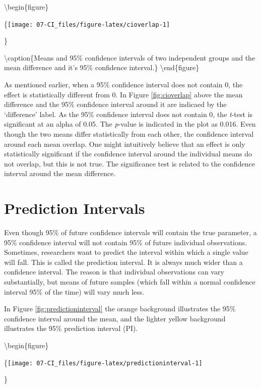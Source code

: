 \documentclass[
]{krantz}
\begin{document}
\textbackslash begin\{figure\}

\{\centering \texttt{[image: 07-CI\_files/figure-latex/cioverlap-1]}

\}

\textbackslash caption\{Means and 95\% confidence intervals of two independent groups and the mean difference and it's 95\% confidence interval.\}\label{fig:cioverlap}
\textbackslash end\{figure\}

As mentioned earlier, when a 95\% confidence interval does not contain 0, the effect is statistically different from 0. In Figure \ref{fig:cioverlap} above the mean difference and the 95\% confidence interval around it are indicaed by the `difference' label. As the 95\% confidence interval does not contain 0, the \emph{t}-test is significant at an alpha of 0.05. The \emph{p}-value is indicated in the plot as 0.016. Even though the two means differ statistically from each other, the confidence interval around each mean overlap. One might intuitively believe that an effect is only statistically significant if the confidence interval around the individual means do not overlap, but this is not true. The significance test is related to the confidence interval around the mean difference.

\hypertarget{prediction-intervals}{%
\section{Prediction Intervals}\label{prediction-intervals}}

Even though 95\% of future confidence intervals will contain the true parameter, a 95\% confidence interval will not contain 95\% of future individual observations. Sometimes, researchers want to predict the interval within which a single value will fall. This is called the prediction interval. It is always much wider than a confidence interval. The reason is that individual observations can vary substantially, but means of future samples (which fall within a normal confidence interval 95\% of the time) will vary much less.

In Figure \ref{fig:predictioninterval} the orange background illustrates the 95\% confidence interval around the mean, and the lighter yellow background illustrates the 95\% prediction interval (PI).

\textbackslash begin\{figure\}

\{\centering \texttt{[image: 07-CI\_files/figure-latex/predictioninterval-1]}

\}
\end{document}
